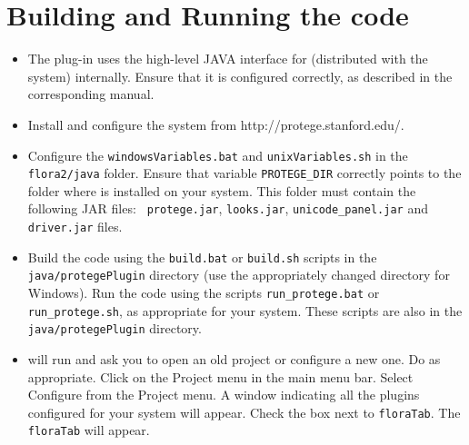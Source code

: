 \section{Building and Running the code}
\begin{itemize}
\item The \Protege plug-in uses the high-level JAVA interface for
\FLSYSTEM (distributed with the \FLSYSTEM system) internally. Ensure that
it is configured correctly, as described in the corresponding manual.
\item Install and configure the \Protege system from
  http://protege.stanford.edu/.
\item Configure the {\tt windowsVariables.bat} and {\tt unixVariables.sh}
  in the {\tt flora2/java} folder. Ensure that variable {\tt PROTEGE\_DIR}
  correctly points to the folder where \Protege is installed on your
  system. This folder must contain the following JAR files: {\tt
  protege.jar}, {\tt looks.jar}, 
  {\tt unicode\_panel.jar}  and {\tt driver.jar}  files.
\item Build the code using the {\tt build.bat} or  {\tt build.sh}  scripts in
the {\tt java/protegePlugin}
directory (use the appropriately changed directory for Windows). Run the
code using the scripts {\tt run\_protege.bat} or  {\tt run\_protege.sh}, as
appropriate for your system. 
These scripts are also in the {\tt java/protegePlugin} directory.
\item \Protege will run and ask you to open an old project or
configure a new one. Do as appropriate. Click on the Project menu in the
main menu bar. Select
Configure from the Project menu. A window indicating all
the plugins configured for your system will appear. Check the
box next to {\tt floraTab}. The {\tt floraTab}  will appear.
\end{itemize}

